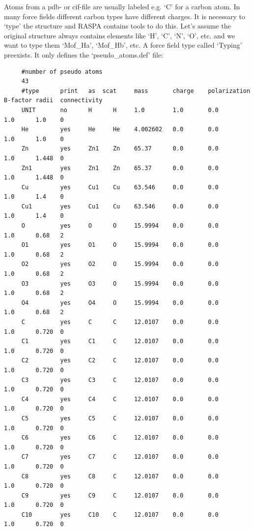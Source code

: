 Atoms from a pdb- or cif-file are usually labeled e.g. `C' for a carbon atom. In many force fields different carbon types have different charges.
It is necessary to `type' the structure and RASPA contains tools to do this. Let's assume the original structure always contains elements like `H', `C',
`N', `O', etc. and we want to type them `Mof\_Ha', `Mof\_Hb', etc. A force field type called `Typing' preexists. It only defines the `pseudo\_atoms.def' file:
\begin{small}
\begin{verbatim}
     #number of pseudo atoms
     43
     #type      print   as  scat     mass       charge    polarization B-factor radii  connectivity
     UNIT       no      H      H     1.0        1.0       0.0          1.0      1.0    0
     He         yes     He     He    4.002602   0.0       0.0          1.0      1.0    0
     Zn         yes     Zn1    Zn    65.37      0.0       0.0          1.0      1.448  0
     Zn1        yes     Zn1    Zn    65.37      0.0       0.0          1.0      1.448  0
     Cu         yes     Cu1    Cu    63.546     0.0       0.0          1.0      1.4    0
     Cu1        yes     Cu1    Cu    63.546     0.0       0.0          1.0      1.4    0
     O          yes     O      O     15.9994    0.0       0.0          1.0      0.68   2
     O1         yes     O1     O     15.9994    0.0       0.0          1.0      0.68   2
     O2         yes     O2     O     15.9994    0.0       0.0          1.0      0.68   2
     O3         yes     O3     O     15.9994    0.0       0.0          1.0      0.68   2
     O4         yes     O4     O     15.9994    0.0       0.0          1.0      0.68   2
     C          yes     C      C     12.0107    0.0       0.0          1.0      0.720  0
     C1         yes     C1     C     12.0107    0.0       0.0          1.0      0.720  0
     C2         yes     C2     C     12.0107    0.0       0.0          1.0      0.720  0
     C3         yes     C3     C     12.0107    0.0       0.0          1.0      0.720  0
     C4         yes     C4     C     12.0107    0.0       0.0          1.0      0.720  0
     C5         yes     C5     C     12.0107    0.0       0.0          1.0      0.720  0
     C6         yes     C6     C     12.0107    0.0       0.0          1.0      0.720  0
     C7         yes     C7     C     12.0107    0.0       0.0          1.0      0.720  0
     C8         yes     C8     C     12.0107    0.0       0.0          1.0      0.720  0
     C9         yes     C9     C     12.0107    0.0       0.0          1.0      0.720  0
     C10        yes     C10    C     12.0107    0.0       0.0          1.0      0.720  0

\end{verbatim}
\end{small}

